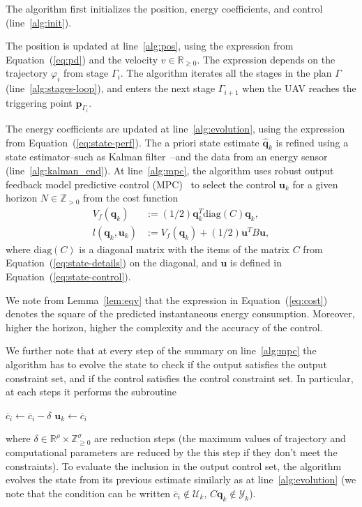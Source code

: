 \documentclass[letterpaper,10pt,conference]{ieeeconf}
\theoremstyle{definition}
\begin{document}
The algorithm first initializes the position, energy coefficients, and control (line~\ref{alg:init}). 

The position is updated at line~\ref{alg:pos}, using the expression from Equation~(\ref{eq:pd}) and the velocity $v\in\mathbb{R}_{\geq 0}$. The expression depends on the trajectory $\varphi_i$ from stage $\Gamma_i$. The algorithm iterates all the stages in the plan $\Gamma$ (line~\ref{alg:stages-loop}), and enters the next stage $\Gamma_{i+1}$ when the UAV reaches the triggering point $\mathbf{p}_{\Gamma_i}$.

The energy coefficients are updated at line~\ref{alg:evolution}, using the expression from Equation~(\ref{eq:state-perf}). The a priori state estimate $\hat{\mathbf{q}}_k$ is refined using a state estimator--such as Kalman filter~\cite{simon2006optimal}--and the data from an energy sensor (line~\ref{alg:kalman_end}).
At line~\ref{alg:mpc}, the algorithm uses robust output feedback model predictive control (MPC)~\cite{rawlings2017model} to select the control $\mathbf{u}_k$ for a given horizon $N\in\mathbb{Z}_{>0}$ from the cost function
\begin{equation}\label{eq:cost}\begin{split}
  V_f(\mathbf{q}_k)&:=(1/2)\mathbf{q}_k^T\mathrm{diag}(C)\mathbf{q}_k,\\
  l(\mathbf{q}_k,\mathbf{u}_k)&:=V_f(\mathbf{q}_k)+(1/2)\mathbf{u}^TB\mathbf{u},
\end{split}\end{equation}
where $\mathrm{diag}(C)$ is a diagonal matrix with the items of the matrix $C$ from Equation~(\ref{eq:state-details}) on the diagonal, and $\mathbf{u}$ is defined in Equation~(\ref{eq:state-control}).

We note from Lemma~\ref{lem:eqv} that the expression in Equation~(\ref{eq:cost}) denotes the square of the predicted instantaneous energy consumption. Moreover, higher the horizon, higher the complexity and the accuracy of the control.

We further note that at every step of the summary on line~\ref{alg:mpc} the algorithm has to evolve the state to check if the output satisfies the output constraint set, and if the control satisfies the control constraint set. In particular, at each steps it performs the subroutine
\begin{algorithmic}
  \label{alg2:while}
    \STATE $\overline{c}_i\gets\overline{c}_i-\delta$
  \ENDWHILE
  \STATE $\mathbf{u}_k\gets\overline{c}_i$
\end{algorithmic} 
where $\delta\in\mathbb{R}^\rho\times\mathbb{Z}_{\geq 0}^\sigma$ are reduction steps (the maximum values of trajectory and computational parameters are reduced by the this step if they don't meet the constraints). To evaluate the inclusion in the output control set, the algorithm evolves the state from its previous estimate similarly as at line~\ref{alg:evolution} (we note that the condition can be written $\overline{c}_i\notin\mathcal{U}_k,\, C\mathbf{q}_k\notin\mathcal{Y}_k$).
\end{document}
